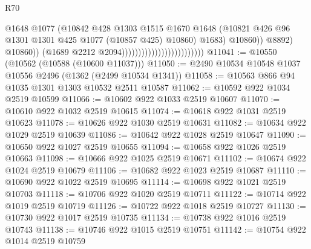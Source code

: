 \begin{lexlean}{R70}
\begin{coremodule}
                                                              @1648
                                                              @1077
                                                              (@10842
                                                                @428
                                                                @1303
                                                                @1515
                                                                @1670
                                                                @1648
                                                                (@10821
                                                                  @426
                                                                  @96
                                                                  @1301
                                                                  @1301
                                                                  @425
                                                                  @1077
                                                                  (@10857 @425)
                                                                  @10860)
                                                                @1683)
                                                              @10860))
                                                          @8892)
                                                        @10860))
                                                    (@1689 @2212 @2094)))))))))))))))))))))))))
@11041 := @10550 (@10562 (@10588 (@10600 @11037)))
@11050 := @2490 @10534 @10548 @1037 @10556 @2496 (@1362 (@2499 @10534 @1341))
@11058 := @10563 @866 @94 @1035 @1301 @1303 @10532 @2511 @10587
@11062 := @10592 @922 @1034 @2519 @10599
@11066 := @10602 @922 @1033 @2519 @10607
@11070 := @10610 @922 @1032 @2519 @10615
@11074 := @10618 @922 @1031 @2519 @10623
@11078 := @10626 @922 @1030 @2519 @10631
@11082 := @10634 @922 @1029 @2519 @10639
@11086 := @10642 @922 @1028 @2519 @10647
@11090 := @10650 @922 @1027 @2519 @10655
@11094 := @10658 @922 @1026 @2519 @10663
@11098 := @10666 @922 @1025 @2519 @10671
@11102 := @10674 @922 @1024 @2519 @10679
@11106 := @10682 @922 @1023 @2519 @10687
@11110 := @10690 @922 @1022 @2519 @10695
@11114 := @10698 @922 @1021 @2519 @10703
@11118 := @10706 @922 @1020 @2519 @10711
@11122 := @10714 @922 @1019 @2519 @10719
@11126 := @10722 @922 @1018 @2519 @10727
@11130 := @10730 @922 @1017 @2519 @10735
@11134 := @10738 @922 @1016 @2519 @10743
@11138 := @10746 @922 @1015 @2519 @10751
@11142 := @10754 @922 @1014 @2519 @10759

\end{coremodule}
\end{lexlean}
